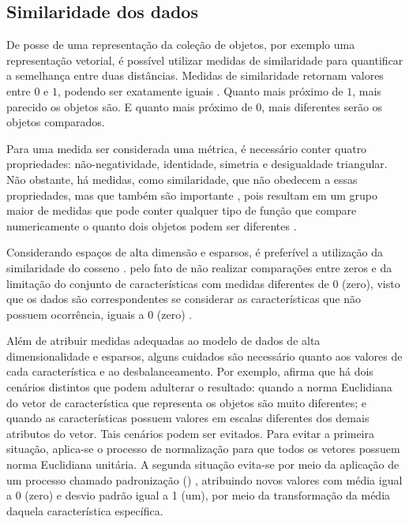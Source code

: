 		\subsection{Similaridade dos dados}
		\label{subsec:similaridade}
			De posse de uma representação da coleção de objetos, por exemplo uma representação
			vetorial, é possível utilizar medidas de similaridade para quantificar a semelhança
			entre duas distâncias. Medidas de similaridade retornam valores entre $0$ e $1$,
			podendo ser exatamente iguais \cite{Alencar}. Quanto mais próximo de $1$, mais
			parecido os objetos são. E quanto mais próximo de $0$, mais diferentes serão os objetos
			comparados.
			
			Para uma medida ser considerada uma métrica, é necessário conter quatro propriedades:
			não-negatividade, identidade, simetria e desigualdade triangular. Não obstante, há
			medidas, como similaridade, que não obedecem a essas propriedades, mas que também
			são importante \cite{phd:paulovich}, pois resultam em um grupo maior de medidas que
			pode conter qualquer tipo de função que compare numericamente o quanto dois objetos
			podem ser diferentes \cite{Tan:2005:IDM:1095618}.
			
			Considerando espaços de alta dimensão e esparsos, é preferível a utilização da
			similaridade do cosseno \cite{phd:paulovich}. pelo fato de não realizar
			comparações entre zeros e da limitação do conjunto de características com
			medidas diferentes de 0 (zero), visto que os dados são correspondentes se
			considerar as características que não possuem ocorrência, iguais a $0$
			(zero) \cite{Tan:2005:IDM:1095618,phd:paulovich}.

			
			Além de atribuir medidas adequadas ao modelo de dados de alta dimensionalidade
			e esparsos, alguns cuidados são necessário quanto aos valores de cada
			característica e ao desbalanceamento. Por exemplo, 
			afirma que há dois cenários distintos que podem adulterar o resultado: quando
			a norma Euclidiana do vetor de característica que representa os objetos são
			muito diferentes; e quando as características possuem valores em escalas
			diferentes dos demais atributos do vetor. Tais cenários podem ser evitados.
			Para evitar a primeira situação, aplica-se o processo de normalização para
			que todos os vetores possuem norma Euclidiana unitária. A segunda situação
			evita-se por meio da aplicação de um processo chamado padronização
			() \cite{Tan:2005:IDM:1095618}, atribuindo novos
			valores com média igual a 0 (zero) e desvio padrão igual a 1 (um), por meio
			da transformação da média daquela característica específica.
			

